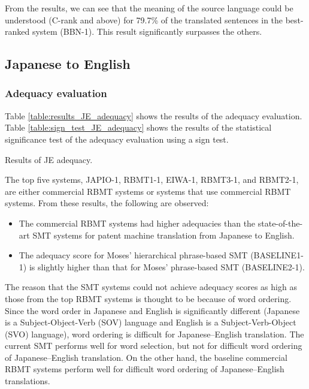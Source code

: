 \documentclass[english]{jnlp_1.4}
\begin{document}
From the results, we can see that the meaning of the source language could be understood (C-rank and above) for 79.7\% of the translated sentences in the best-ranked system (BBN-1). 
This result significantly surpasses the others.


\subsection{Japanese to English}

\subsubsection{Adequacy evaluation}

Table \ref{table:results_JE_adequacy} shows the results of the adequacy evaluation. 
Table \ref{table:sign_test_JE_adequacy} shows the results of the statistical significance test of the adequacy evaluation using a sign test.

\begin{table}[b]
\caption{Results of JE adequacy.}
\label{table:results_JE_adequacy}

\end{table}

The top five systems, JAPIO-1, RBMT1-1, EIWA-1, RBMT3-1, and RBMT2-1, are either commercial RBMT systems or systems that use commercial RBMT systems.
From these results, the following are observed:
\begin{itemize}
\item The commercial RBMT systems had higher adequacies than the state-of-the-art SMT systems for patent machine translation from Japanese to English.
\item The adequacy score for Moses' hierarchical phrase-based SMT (BASELINE1-1) is slightly higher than that for Moses' phrase-based SMT (BASELINE2-1).
\end{itemize}

The reason that the SMT systems could not achieve adequacy scores as high as those from the top RBMT systems is thought to be because of word ordering.  
Since the word order in Japanese and English is significantly different (Japanese is a Subject-Object-Verb (SOV) language and English is a Subject-Verb-Object (SVO) language), word ordering is difficult for Japanese--English translation.
The current SMT performs well for word selection, but not for difficult word ordering of Japanese--English translation. 
On the other hand, the baseline commercial RBMT systems perform well for difficult word ordering of Japanese--English translations. 
\end{document}
